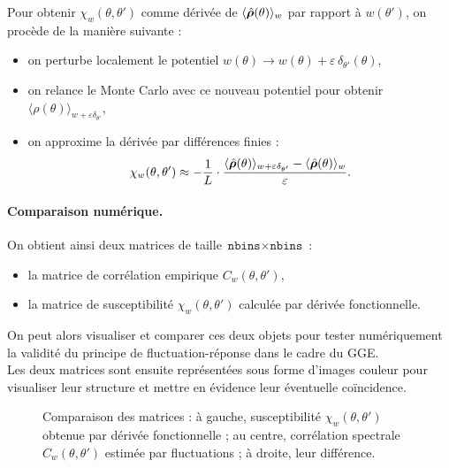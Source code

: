 Pour obtenir \( \chi_w(\theta, \theta') \) comme dérivée de \( \langle \hat{\bm{\rho}}(\theta) \rangle_w \) par rapport à \( w(\theta') \), on procède de la manière suivante :
\begin{itemize}
    \item on perturbe localement le potentiel \( w(\theta) \rightarrow w(\theta) + \varepsilon\, \delta_{\theta'}(\theta) \),
    \item on relance le Monte Carlo avec ce nouveau potentiel pour obtenir \( \langle \rho(\theta) \rangle_{w + \varepsilon \delta_{\theta'}} \),
    \item on approxime la dérivée par différences finies :
    \[
    \chi_w(\theta, \theta') \approx -\frac{1}{L} \cdot \frac{ \langle \hat{\bm{\rho}}(\theta) \rangle_{w + \varepsilon \delta_{\theta'}} -  \langle\hat{\bm{\rho}} (\theta) \rangle_w }{ \varepsilon }.
    \]
\end{itemize}

\paragraph{Comparaison numérique.}
On obtient ainsi deux matrices de taille \( \texttt{nbins} \times \texttt{nbins} \) :
\begin{itemize}
    \item la matrice de corrélation empirique \( C_w(\theta, \theta') \),
    \item la matrice de susceptibilité \( \chi_w(\theta, \theta') \) calculée par dérivée fonctionnelle.
\end{itemize}

On peut alors visualiser et comparer ces deux objets pour tester numériquement la validité du principe de fluctuation-réponse dans le cadre du GGE.\\

Les deux matrices sont ensuite représentées sous forme d'images couleur pour visualiser leur structure et mettre en évidence leur éventuelle coïncidence.

\begin{figure}[H]
    \centering
    \caption{Comparaison des matrices : à gauche, susceptibilité \( \chi_w(\theta,\theta') \) obtenue par dérivée fonctionnelle ; au centre, corrélation spectrale \( C_w(\theta,\theta') \) estimée par fluctuations ; à droite, leur différence.}
    \label{fig:comparison_chi_C}
\end{figure}

